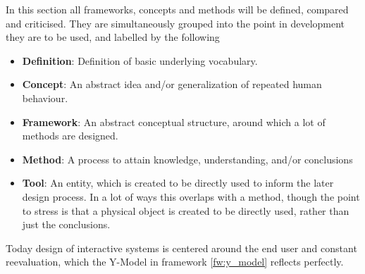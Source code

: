 In this section all frameworks, concepts and methods will be defined, compared
and criticised. They are simultaneously grouped into the point in development
they are to be used, and labelled by the following
\begin{itemize}
\item \textbf{Definition}: Definition of basic underlying vocabulary.

\item \textbf{Concept}: An abstract idea and/or generalization of repeated human
  behaviour.

\item \textbf{Framework}: An abstract conceptual structure, around which
  a lot of methods are designed.
  
\item \textbf{Method}: A process to attain knowledge, understanding, and/or
  conclusions
  
\item \textbf{Tool}: An entity, which is created to be directly used to inform
  the later design process. In a lot of ways this overlaps with a method, though
  the point to stress is that a physical object is created to be directly used,
  rather than just the conclusions.
\end{itemize}

Today design of interactive systems is centered around the end user and constant
reevaluation, which the Y-Model in framework \ref{fw:y_model} reflects
perfectly. 

\begin{framework}[Y-Model] \label{fw:y_model} 
  
\end{framework}
